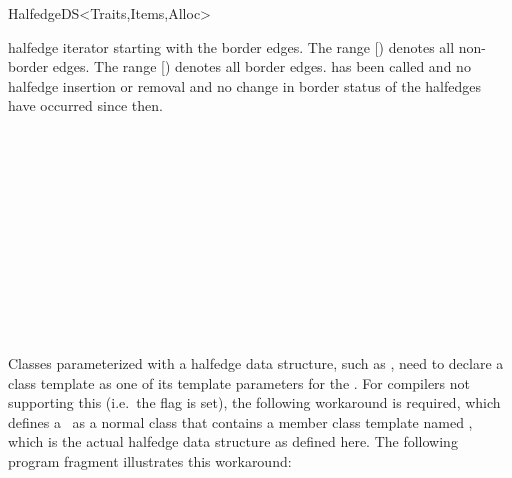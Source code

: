 \begin{ccRefConcept}{HalfedgeDS<Traits,Items,Alloc>}
\begin{ccAdvanced}
    {halfedge iterator starting with the border edges. The range
      [) denotes
    all non-border edges. The range
    [) denotes all
    border edges.
    \ccPrecond {} has been called and no
    halfedge insertion or removal and no change in border
    status of the halfedges have occurred since then.}

\vspace*{-4mm}
\end{ccAdvanced}


\ccHasModels

\\
\\

\ccSeeAlso

\\
\\
\\
\\
\\
\\
\\
\\

\ccImplementation

Classes parameterized with a halfedge data structure, such as
, need to declare a class template as one of its
template parameters for the \ccRefName. For compilers not supporting
this (i.e.~the flag  is set), the
following workaround is required, which defines a \ccRefName\ as a
normal class that contains a member class template named ,
which is the actual halfedge data structure as defined here. The
following program fragment illustrates this workaround:


\end{ccRefConcept}
